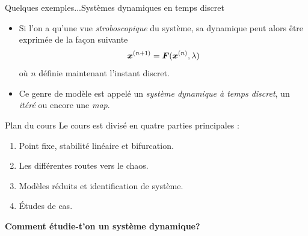 \documentclass[usenames,dvipsnames,svgnames,10pt,aspectratio=169]{beamer}
\begin{document}
\begin{frame}[t, c]{Quelques exemples...}{Systèmes dynamiques en temps discret}

	\begin{itemize}
		\item Si l'on a qu'une vue \emph{stroboscopique} du système, sa dynamique peut alors être exprimée de la façon suivante
		\begin{equation}
			{\bm x}^{(n+1)} = \bm{F}({\bm x}^{(n)}, \lambda)
			\notag
		\end{equation}
		où $n$ définie maintenant l'instant discret.

		\bigskip

		\item Ce genre de modèle est appelé un \emph{système dynamique à temps discret}, un \emph{itéré} ou encore une \emph{map}.
	\end{itemize}

		\vspace{1cm}
\end{frame}

\begin{frame}[t, c]{Plan du cours}{}
	Le cours est divisé en quatre parties principales :
	\bigskip
	\begin{enumerate}
		\item Point fixe, stabilité linéaire et bifurcation.
		\bigskip
		\item Les différentes routes vers le chaos.
		\bigskip
		\item Modèles réduits et identification de système.
		\bigskip
		\item \'Etudes de cas.
	\end{enumerate}

	\vspace{1cm}
\end{frame}



\begin{frame}[t, c]{}{}

	\centering

	{\Large \textbf{Comment étudie-t'on un système dynamique?}}

	\bigskip


	\vspace{-2cm}
\end{frame}
\end{document}
